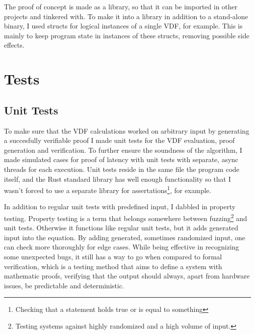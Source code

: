 
The proof of concept is made as a library, so that it can be imported in other projects and tinkered with. To make it into a library in addition to a stand-alone binary, I used structs for logical instances of a single VDF, for example. This is mainly to keep program state in instances of these structs, removing possible side effects.


\section{Tests}
\subsection{Unit Tests}
To make sure that the VDF calculations worked on arbitrary input by generating a succesfully verifiable proof I made unit tests for the VDF evaluation, proof generation and verification. To further ensure the soundness of the algorithm, I made simulated cases for proof of latency with unit tests with separate, async threads for each execution. Unit tests reside in the same file the program code itself, and the Rust standard library has well enough functionality so that I wasn't forced to use a separate library for assertations\footnote{Checking that a statement holds true or is equal to something}, for example.

In addition to regular unit tests with predefined input, I dabbled in property testing. Property testing is a term that belongs somewhere between fuzzing\footnote{Testing systems against highly randomized and a high volume of input.} and unit tests. Otherwise it functions like regular unit tests, but it adds generated input into the equation. By adding generated, sometimes randomized input, one can check more thoroughly for edge cases. While being effective in recognizing some unexpected bugs, it still has a way to go when compared to formal verification, which is a testing method that aims to define a system with mathematic proofs, verifying that the output should always, apart from hardware issues, be predictable and deterministic.

